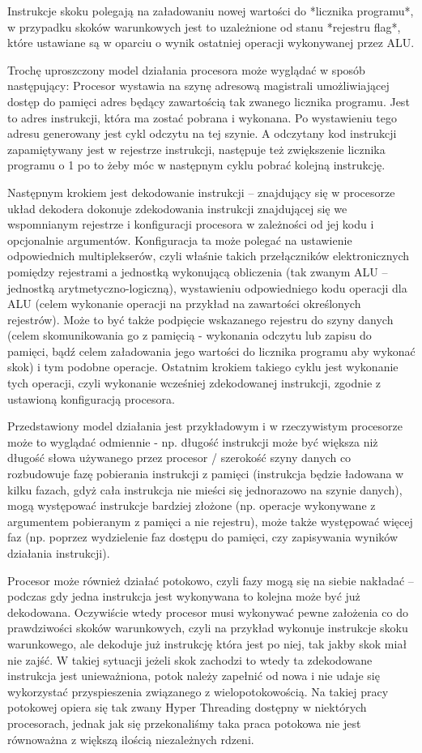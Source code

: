 Instrukcje skoku polegają na załadowaniu nowej wartości do *licznika programu*, w przypadku skoków warunkowych jest to uzależnione od stanu *rejestru flag*, które ustawiane są w oparciu o wynik ostatniej operacji wykonywanej przez ALU.

Trochę uproszczony model działania procesora może wyglądać w sposób następujący: Procesor wystawia na szynę adresową magistrali umożliwiającej dostęp do pamięci adres będący zawartością tak zwanego licznika programu. Jest to adres instrukcji, która ma zostać pobrana i wykonana. Po wystawieniu tego adresu generowany jest cykl odczytu na tej szynie. A odczytany kod instrukcji zapamiętywany jest w rejestrze instrukcji, następuje też zwiększenie licznika programu o 1 po to żeby móc w następnym cyklu pobrać kolejną instrukcję.
	
Następnym krokiem jest dekodowanie instrukcji – znajdujący się w procesorze układ dekodera dokonuje zdekodowania instrukcji znajdującej się we wspomnianym rejestrze i konfiguracji procesora w zależności od jej kodu i opcjonalnie argumentów. Konfiguracja ta może polegać na ustawienie odpowiednich multiplekserów, czyli właśnie takich przełączników elektronicznych pomiędzy rejestrami a jednostką wykonującą obliczenia (tak zwanym ALU – jednostką arytmetyczno-logiczną), wystawieniu odpowiedniego kodu operacji dla ALU (celem wykonanie operacji na przykład na zawartości określonych rejestrów). Może to być także podpięcie wskazanego rejestru do szyny danych (celem skomunikowania go z pamięcią - wykonania odczytu lub zapisu do pamięci, bądź celem załadowania jego wartości do licznika programu aby wykonać skok) i tym podobne operacje. Ostatnim krokiem takiego cyklu jest wykonanie tych operacji, czyli wykonanie wcześniej zdekodowanej instrukcji, zgodnie z ustawioną konfiguracją procesora.

Przedstawiony model działania jest przykładowym i w rzeczywistym procesorze może to wyglądać odmiennie - np. długość instrukcji może być większa niż długość słowa używanego przez procesor / szerokość szyny danych co rozbudowuje fazę pobierania instrukcji z pamięci (instrukcja będzie ładowana w kilku fazach, gdyż cała instrukcja nie mieści się jednorazowo na szynie danych), mogą występować instrukcje bardziej złożone (np. operacje wykonywane z argumentem pobieranym z pamięci a nie rejestru), może także występować więcej faz (np. poprzez wydzielenie faz dostępu do pamięci, czy zapisywania wyników działania instrukcji).

Procesor może również działać potokowo, czyli fazy mogą się na siebie nakładać – podczas gdy jedna instrukcja jest wykonywana to kolejna może być już dekodowana. Oczywiście wtedy procesor musi wykonywać pewne założenia co do prawdziwości skoków warunkowych, czyli na przykład wykonuje instrukcje skoku warunkowego, ale dekoduje już instrukcję która jest po niej, tak jakby skok miał nie zajść. W takiej sytuacji jeżeli skok zachodzi to wtedy ta zdekodowane instrukcja jest unieważniona, potok należy zapełnić od nowa i nie udaje się wykorzystać przyspieszenia związanego z wielopotokowością. Na takiej pracy potokowej opiera się tak zwany Hyper Threading dostępny w niektórych procesorach, jednak jak się przekonaliśmy taka praca potokowa nie jest równoważna z większą ilością niezależnych rdzeni.

